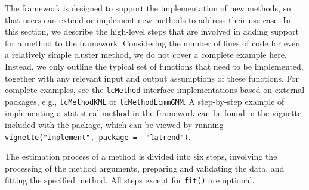 The framework is designed to support the implementation of new methods, so that users can extend or implement new methods to address their use case. In this section, we describe the high-level steps that are involved in adding support for a method to the framework. Considering the number of lines of code for even a relatively simple cluster method, we do not cover a complete example here. Instead, we only outline the typical set of functions that need to be implemented, together with any relevant input and output assumptions of these functions. For complete examples, see the \texttt{lcMethod}-interface implementations based on external packages, e.g., \texttt{lcMethodKML} or \texttt{lcMethodLcmmGMM}. A step-by-step example of implementing a statistical method in the framework can be found in the vignette included with the package, which can be viewed by running \texttt{vignette("implement",\ package\ =\ \ "latrend")}.

The estimation process of a method is divided into six steps, involving the processing of the method arguments, preparing and validating the data, and fitting the specified method. All steps except for \texttt{fit()} are optional.


